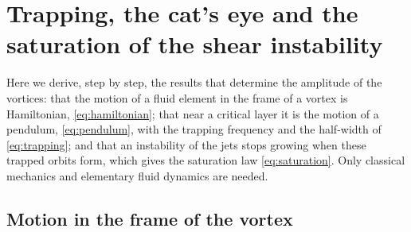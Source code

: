 \section{Trapping, the cat's eye and the saturation of the shear instability}\label{app:trapping}

Here we derive, step by step, the results that determine the amplitude of the vortices: that the motion of a fluid element in the frame of a vortex is Hamiltonian, \cref{eq:hamiltonian}; that near a critical layer it is the motion of a pendulum, \cref{eq:pendulum}, with the trapping frequency and the half-width of \cref{eq:trapping}; and that an instability of the jets stops growing when these trapped orbits form, which gives the saturation law \cref{eq:saturation}. Only classical mechanics and elementary fluid dynamics are needed.

\subsection{Motion in the frame of the vortex}\label{app:trapping_frame}

